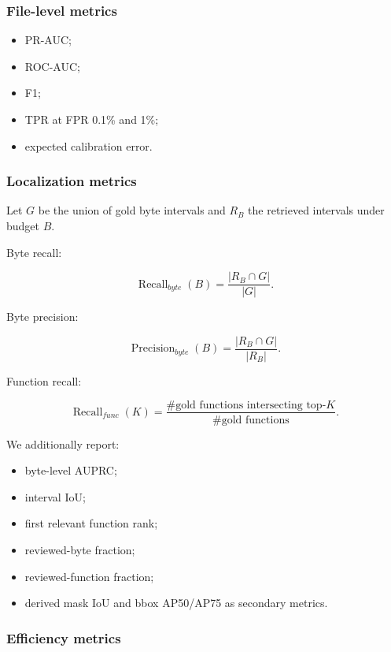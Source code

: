 \documentclass[
  10pt,
]{article}
\providecommand{\tightlist}{%
  \setlength{\itemsep}{0pt}\setlength{\parskip}{0pt}}
\begin{document}
\subsubsection{File-level metrics}\label{file-level-metrics}

\begin{itemize}
\tightlist
\item
  PR-AUC;
\item
  ROC-AUC;
\item
  F1;
\item
  TPR at FPR 0.1\% and 1\%;
\item
  expected calibration error.
\end{itemize}

\subsubsection{Localization metrics}\label{localization-metrics}

Let \(G\) be the union of gold byte intervals and \(R_B\) the retrieved
intervals under budget \(B\).

Byte recall:

\[
\operatorname{Recall}_{byte}(B)=\frac{|R_B\cap G|}{|G|}.
\]

Byte precision:

\[
\operatorname{Precision}_{byte}(B)=\frac{|R_B\cap G|}{|R_B|}.
\]

Function recall:

\[
\operatorname{Recall}_{func}(K)=\frac{\#\text{gold functions intersecting top-}K}{\#\text{gold functions}}.
\]

We additionally report:

\begin{itemize}
\tightlist
\item
  byte-level AUPRC;
\item
  interval IoU;
\item
  first relevant function rank;
\item
  reviewed-byte fraction;
\item
  reviewed-function fraction;
\item
  derived mask IoU and bbox AP50/AP75 as secondary metrics.
\end{itemize}

\subsubsection{Efficiency metrics}\label{efficiency-metrics}
\end{document}
